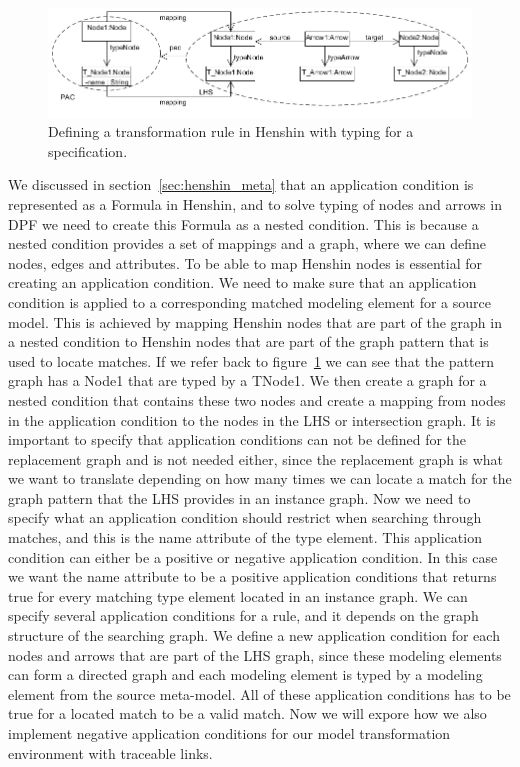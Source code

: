 \begin{figure}[H] 
	\centering
	\includegraphics[scale=0.7]{./Figures/PAC_to_Henshin.png}
	\caption[How to handle node types for a rule in Henshin]
	{Defining a transformation rule in Henshin with typing for a
	specification.}
	\label{fig:pac_henshin_condition}
\end{figure}

We discussed in section~\ref{sec:henshin_meta} that an application condition is
represented as a Formula in Henshin, and to solve typing of nodes and arrows in
DPF we need to create this Formula as a nested condition. This is because a
nested condition provides a set of mappings and a graph, where we can define
nodes, edges and attributes. To be able to map Henshin nodes is essential for
creating an application condition. We need to make sure that an application
condition is applied to a corresponding matched modeling element for a source
model. This is achieved by mapping Henshin nodes that are part of the graph in a
nested condition to Henshin nodes that are part of the graph pattern that
is used to locate matches. If we refer back to
figure~\ref{fig:pac_henshin_condition} we can see that the pattern graph has a
Node1 that are typed by a T\textunderscore Node1. We then create a graph for a
nested condition that contains these two nodes and create a mapping from nodes
in the application condition to the nodes in the LHS or intersection graph. It
is important to specify that application conditions can not be defined for the
replacement graph and is not needed either, since the replacement graph is what
we want to translate depending on how many times we can locate a match for the
graph pattern that the LHS provides in an instance graph. Now we need to specify
what an application condition should restrict when searching through matches,
and this is the name attribute of the type element. This application condition
can either be a positive or negative application condition. In this case we want
the name attribute to be a positive application conditions that returns true for
every matching type element located in an instance graph. We can specify
several application conditions for a rule, and it depends on the graph structure
of the searching graph. We define a new application condition for each nodes and
arrows that are part of the LHS graph, since these modeling elements can form a
directed graph and each modeling element is typed by a modeling element from the
source meta-model. All of these application conditions has to be true for a
located match to be a valid match. Now we will expore how we also implement
negative application conditions for our model transformation environment with
traceable links. 

